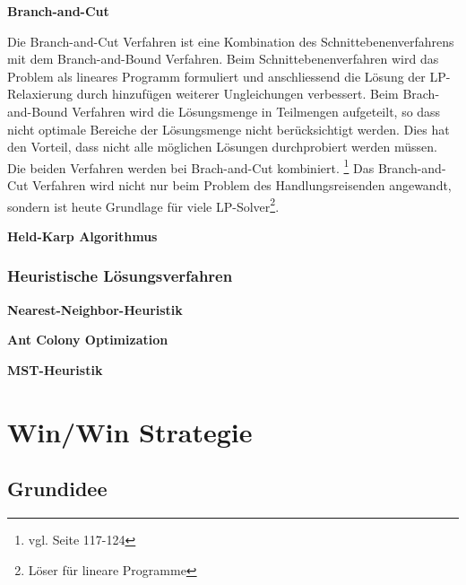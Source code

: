 \documentclass[11pt,a4paper]{article}
\begin{document}
\medskip

\begin{flushleft}
\textbf{Branch-and-Cut}

Die Branch-and-Cut Verfahren ist eine Kombination des Schnittebenenverfahrens mit dem Branch-and-Bound Verfahren. 
Beim Schnittebenenverfahren wird das Problem als lineares Programm formuliert und anschliessend die Lösung der LP-Relaxierung durch hinzufügen weiterer Ungleichungen verbessert.
Beim Brach-and-Bound Verfahren wird die Lösungsmenge in Teilmengen aufgeteilt, so dass nicht optimale Bereiche der Lösungsmenge nicht berücksichtigt werden. Dies hat den Vorteil, dass nicht alle möglichen Lösungen durchprobiert werden müssen.
Die beiden Verfahren werden bei Brach-and-Cut kombiniert. \footnote{vgl. \cite{applegate06} Seite 117-124}
Das Branch-and-Cut Verfahren wird nicht nur beim Problem des Handlungsreisenden angewandt, sondern ist heute Grundlage für viele LP-Solver\footnote{Löser für lineare Programme}.

\end{flushleft}

\medskip

\begin{flushleft}
\textbf{Held-Karp Algorithmus}
\end{flushleft}

\subsubsection{Heuristische Lösungsverfahren}
\begin{flushleft}
\textbf{Nearest-Neighbor-Heuristik}

\end{flushleft}

\medskip

\begin{flushleft}
\textbf{Ant Colony Optimization}

\end{flushleft}

\medskip

\begin{flushleft}
\textbf{MST-Heuristik}

\end{flushleft}
\newpage
\section{Win/Win Strategie}
\subsection{Grundidee}
\end{document}
